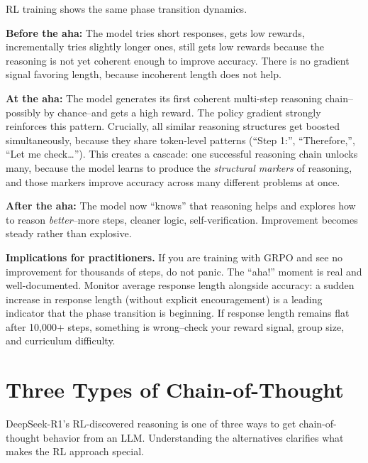 \begin{chapterenv}
\begin{infobox}
RL training shows the same phase transition dynamics.

\textbf{Before the aha:} The model tries short responses, gets low rewards, incrementally tries slightly longer ones, still gets low rewards because the reasoning is not yet coherent enough to improve accuracy. There is no gradient signal favoring length, because incoherent length does not help.

\textbf{At the aha:} The model generates its first coherent multi-step reasoning chain--possibly by chance--and gets a high reward. The policy gradient strongly reinforces this pattern. Crucially, all similar reasoning structures get boosted simultaneously, because they share token-level patterns (``Step 1:'', ``Therefore,'', ``Let me check\ldots''). This creates a cascade: one successful reasoning chain unlocks many, because the model learns to produce the \textit{structural markers} of reasoning, and those markers improve accuracy across many different problems at once.

\textbf{After the aha:} The model now ``knows'' that reasoning helps and explores how to reason \textit{better}--more steps, cleaner logic, self-verification. Improvement becomes steady rather than explosive.
\end{infobox}

\begin{tipbox}
\textbf{Implications for practitioners.} If you are training with GRPO and see no improvement for thousands of steps, do not panic. The ``aha!'' moment is real and well-documented. Monitor average response length alongside accuracy: a sudden increase in response length (without explicit encouragement) is a leading indicator that the phase transition is beginning. If response length remains flat after 10,000+ steps, something is wrong--check your reward signal, group size, and curriculum difficulty.
\end{tipbox}

\section{Three Types of Chain-of-Thought}


DeepSeek-R1's RL-discovered reasoning is one of three ways to get chain-of-thought behavior from an LLM. Understanding the alternatives clarifies what makes the RL approach special.


\end{chapterenv}
